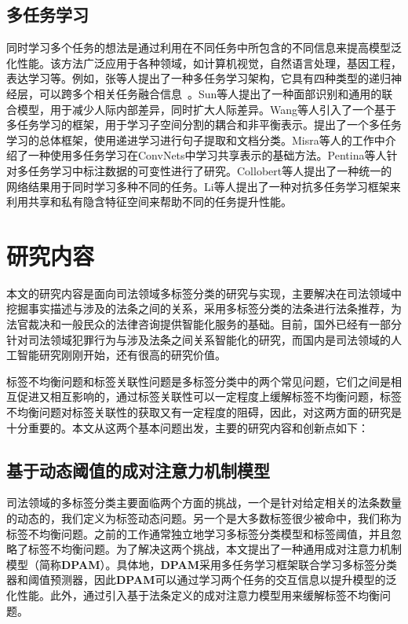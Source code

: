 \subsection{多任务学习}
同时学习多个任务的想法是通过利用在不同任务中所包含的不同信息来提高模型泛化性能。该方法广泛应用于各种领域，如计算机视觉\cite{Torralba2007Sharing, Yim2015Rotating, Zhang2013Robust}，自然语言处理\cite{Liu2017Adversarial, Glorot2011Domain, collobert2008unified, Liu2015Representation, luong2015multi}，基因工程\cite{Dong2014Inferring, Zhong2013User}，表达学习\cite{argyriou2007multi, Kang2011Learning, Zhang2010Probabilistic}等。例如，张等人提出了一种多任务学习架构，它具有四种类型的递归神经层，可以跨多个相关任务融合信息~\cite{Zhang2017A}。Sun等人提出了一种面部识别和通用的联合模型，用于减少人际内部差异，同时扩大人际差异\cite{Sun2014Deep}。Wang等人引入了一个基于多任务学习的框架，用于学习子空间分割的耦合和非平衡表示\cite{Wang2015Multi}。提出了一个多任务学习的总体框架，使用递进学习进行句子提取和文档分类\cite{Masaru2017Masaru}。Misra等人的工作中介绍了一种使用多任务学习在ConvNets中学习共享表示的基础方法\cite{Misra2016Cross}。Pentina等人针对多任务学习中标注数据的可变性进行了研究\cite{Pentina2017Multi}。Collobert等人提出了一种统一的网络结果用于同时学习多种不同的任务\cite{collobert2008unified}。Li等人提出了一种对抗多任务学习框架来利用共享和私有隐含特征空间来帮助不同的任务提升性能\cite{Li2016Self}。

\section{研究内容}
本文的研究内容是面向司法领域多标签分类的研究与实现，主要解决在司法领域中挖掘事实描述与涉及的法条之间的关系，采用多标签分类的法条进行法条推荐，为法官裁决和一般民众的法律咨询提供智能化服务的基础。目前，国外已经有一部分针对司法领域犯罪行为与涉及法条之间关系智能化的研究，而国内是司法领域的人工智能研究刚刚开始，还有很高的研究价值。

标签不均衡问题和标签关联性问题是多标签分类中的两个常见问题，它们之间是相互促进又相互影响的，通过标签关联性可以一定程度上缓解标签不均衡问题，标签不均衡问题对标签关联性的获取又有一定程度的阻碍，因此，对这两方面的研究是十分重要的。本文从这两个基本问题出发，主要的研究内容和创新点如下：

\subsection{基于动态阈值的成对注意力机制模型}
司法领域的多标签分类主要面临两个方面的挑战，一个是针对给定相关的法条数量的动态的，我们定义为标签动态问题。另一个是大多数标签很少被命中，我们称为标签不均衡问题。之前的工作通常独立地学习多标签分类模型和标签阈值，并且忽略了标签不均衡问题。为了解决这两个挑战，本文提出了一种通用成对注意力机制模型（简称\textbf{DPAM}）。具体地，\textbf{DPAM}采用多任务学习框架联合学习多标签分类器和阈值预测器，因此\textbf{DPAM}可以通过学习两个任务的交互信息以提升模型的泛化性能。此外，通过引入基于法条定义的成对注意力模型用来缓解标签不均衡问题。


